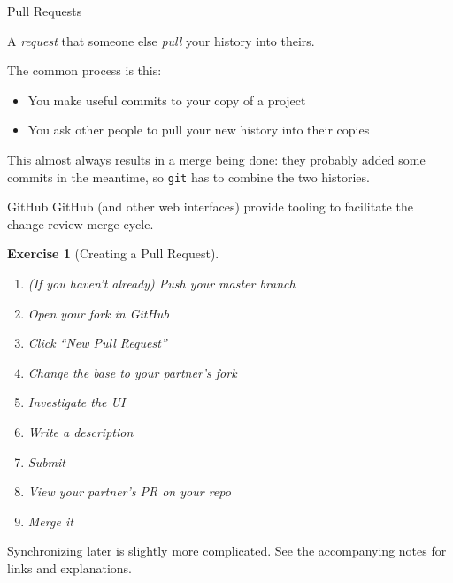 \documentclass{beamer}
\theoremstyle{example}
\newtheorem{exercise}{Exercise}
\begin{document}
\begin{frame}{Pull Requests}
    \begin{definition}
        A \emph{request} that someone else \emph{pull} your history into theirs.
    \end{definition}
    The common process is this:
    \begin{itemize}
        \item You make useful commits to your copy of a project
        \item You ask other people to pull your new history into their copies
    \end{itemize}
    This almost always results in a merge being done: they probably added some
    commits in the meantime, so \texttt{git} has to combine the two histories.
    \begin{block}{GitHub}
        GitHub (and other web interfaces) provide tooling to facilitate the
        change-review-merge cycle.
    \end{block}
\end{frame}

\begin{frame}
    \begin{exercise}[Creating a Pull Request]
        \begin{enumerate}
            \item (If you haven't already) Push your master branch
            \item Open your fork in GitHub
            \item Click ``New Pull Request''
            \item Change the base to your \emph{partner's} fork
            \item Investigate the UI
            \item Write a description
            \item Submit
            \item View your partner's PR on your repo
            \item Merge it
        \end{enumerate}
    \end{exercise}

    Synchronizing later is slightly more complicated. See the accompanying notes
    for links and explanations.
\end{frame}
\end{document}
